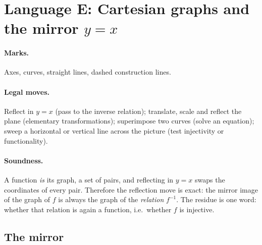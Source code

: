 \section{Language E: Cartesian graphs and the mirror $y=x$}
\label{sec:graphs}

\paragraph{Marks.} Axes, curves, straight lines, dashed construction lines.
\paragraph{Legal moves.} Reflect in $y=x$ (pass to the inverse relation); translate,
scale and reflect the plane (elementary transformations); superimpose two curves (solve an
equation); sweep a horizontal or vertical line across the picture (test injectivity or
functionality).
\paragraph{Soundness.} A function \emph{is} its graph, a set of pairs, and reflecting in
$y=x$ swaps the coordinates of every pair. Therefore the reflection move is exact: the
mirror image of the graph of $f$ is always the graph of the \emph{relation} $f^{-1}$. The
residue is one word: whether that relation is again a function, i.e.\ whether $f$ is
injective.

\subsection{The mirror}

